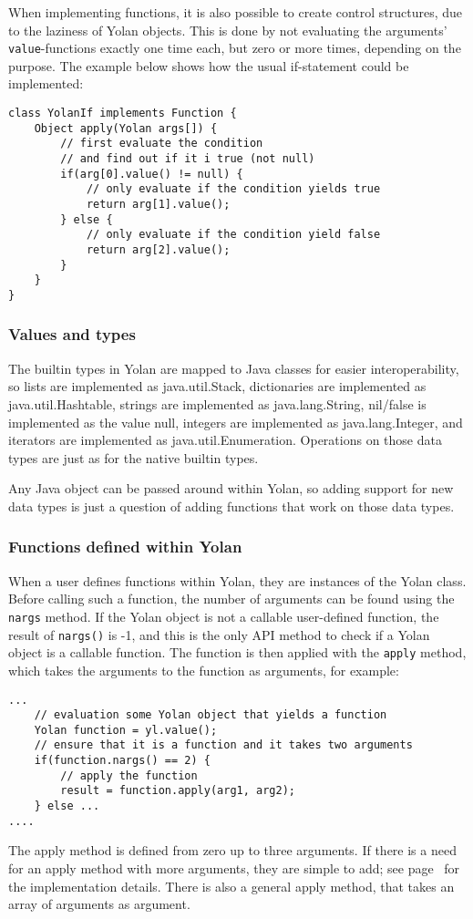 \documentclass[11pt]{report}
\begin{document}
When implementing functions, it is also possible to create control structures, due to the laziness of Yolan objects. This is done by not evaluating the arguments' \verb|value|-functions exactly one time each, but zero or more times, depending on the purpose. The example below shows how the usual if-statement could be implemented:
\begin{lstlisting}
class YolanIf implements Function {
    Object apply(Yolan args[]) {
        // first evaluate the condition
        // and find out if it i true (not null)
        if(arg[0].value() != null) {
            // only evaluate if the condition yields true
            return arg[1].value();
        } else {
            // only evaluate if the condition yield false
            return arg[2].value();
        }
    }
}
\end{lstlisting}
\subsubsection{Values and types}
The builtin types in Yolan are mapped to Java classes for easier interoperability,
so lists are implemented as java.util.Stack, dictionaries are implemented as java.util.Hashtable, strings are implemented as java.lang.String, nil/false is implemented as the value null, integers are implemented as java.lang.Integer, and iterators are implemented as java.util.Enumeration. 
Operations on those data types are just as for the native builtin types. 

Any Java object can be passed around within Yolan, so adding support for new data types is just a question of adding functions that work on those data types.

\subsubsection{Functions defined within Yolan}
When a user defines functions within Yolan, they are instances of the Yolan class. 
Before calling such a function, the number of arguments can be found using the \verb|nargs| method.
If the Yolan object is not a callable user-defined function, the result of \verb|nargs()| is -1, and this is the only API method to check if a Yolan object is a callable function.
The function is then applied with the \verb|apply| method, which takes the arguments to the function as arguments, for example:
\begin{lstlisting}
...
    // evaluation some Yolan object that yields a function
    Yolan function = yl.value();
    // ensure that it is a function and it takes two arguments
    if(function.nargs() == 2) {
        // apply the function 
        result = function.apply(arg1, arg2);
    } else ...
....
\end{lstlisting}
The apply method is defined from zero up to three arguments. If there is a need for an apply method with more arguments, they are simple to add; see page~\pageref{source-yolan-apply} for the implementation details. There is also a general apply method, that takes an array of arguments as argument.
\end{document}
